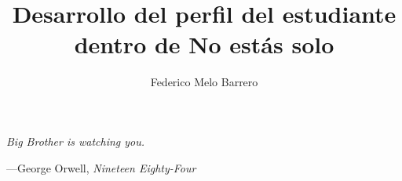 \documentclass{fmb-thesis}
\title{Desarrollo del perfil del estudiante\\dentro de No estás solo}
\author{Federico Melo Barrero\inst{1}}
\begin{document}
\maketitle




\pagebreak
\epigraph{\itshape Big Brother is watching you.}{---George Orwell, \textit{Nineteen Eighty-Four}}

\tableofcontents
\vspace*{\fill}

\pagebreak






\appendix


\clearpage

\printglossary
{}  %

\clearpage



\end{document}
